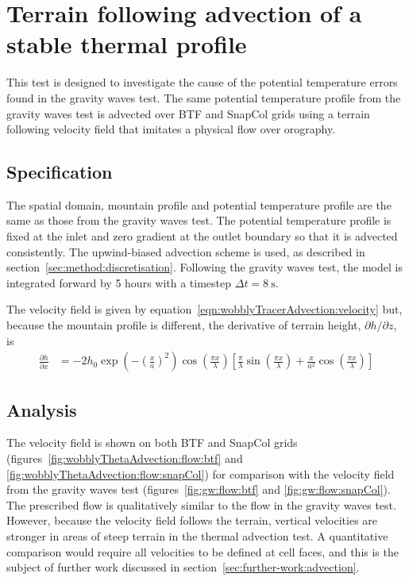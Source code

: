 \section{Terrain following advection of a stable thermal profile}
\label{sec:wobblyThetaAdvection}

This test is designed to investigate the cause of the potential temperature errors found in the gravity waves test.  The same potential temperature profile from the gravity waves test is advected over BTF and SnapCol grids using a terrain following velocity field that imitates a physical flow over orography.

\subsection{Specification}
The spatial domain, mountain profile and potential temperature profile are the same as those from the gravity waves test.  The potential temperature profile is fixed at the inlet and zero gradient at the outlet boundary so that it is advected consistently.  The upwind-biased advection scheme is used, as described in section~\ref{sec:method:discretisation}.  Following the gravity waves test, the model is integrated forward by 5 hours with a timestep $\Delta t = \SI{8}{\second}$. 

The velocity field is given by equation~\ref{eqn:wobblyTracerAdvection:velocity} but, because the mountain profile is different, the derivative of terrain height, $\partial h / \partial z$, is
\begin{align}
\frac{\partial h}{\partial x} &= - 2 h_0 \exp \left( - \left( \frac{x}{a} \right)^2 \right) \cos \left( \frac{\pi x}{\lambda} \right) \left[
\frac{\pi}{\lambda} \sin \left(\frac{\pi x}{\lambda} \right) +
\frac{x}{a^2} \cos \left( \frac{\pi x}{\lambda} \right) \right]
\end{align}

\subsection{Analysis}
The velocity field is shown on both BTF and SnapCol grids (figures~\ref{fig:wobblyThetaAdvection:flow:btf} and \ref{fig:wobblyThetaAdvection:flow:snapCol}) for comparison with the velocity field from the gravity waves test (figures~\ref{fig:gw:flow:btf} and \ref{fig:gw:flow:snapCol}).  The prescribed flow is qualitatively similar to the flow in the gravity waves test.  However, because the velocity field follows the terrain, vertical velocities are stronger in areas of steep terrain in the thermal advection test.  A quantitative comparison would require all velocities to be defined at cell faces, and this is the subject of further work discussed in section~\ref{sec:further-work:advection}.

